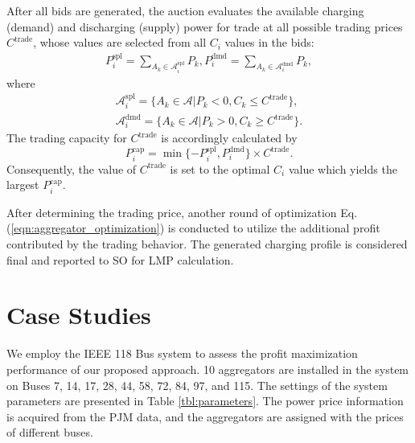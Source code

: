 \documentclass[conference]{IEEEtran}
\begin{document}
	After all bids are generated, the auction evaluates the available charging (demand) and discharging (supply) power for trade at all possible trading prices $C^\text{trade}$, whose values are selected from all $C_i$ values in the bids:
	\begin{align}\label{eqn:calculate_supplydemand}
	P^\text{spl}_i = \sum_{A_k\in\mathcal{A}^\text{spl}_i} P_k, 
	P^\text{dmd}_i = \sum_{A_k\in\mathcal{A}^\text{dmd}_i} P_k,
	\end{align}
	where
	\begin{align}
	\mathcal{A}^\text{spl}_i = \{A_k\in\mathcal{A}| P_k<0, C_k\leq C^\text{trade}\}, \label{eqn:selling}\\
	\mathcal{A}^\text{dmd}_i = \{A_k\in\mathcal{A}| P_k>0, C_k\geq C^\text{trade}\}. \label{eqn:buying}
	\end{align}
	The trading capacity for $C^\text{trade}$ is accordingly calculated by
	\begin{equation}
	P^\text{cap}_i = \min\{-P^\text{spl}_i,P^\text{dmd}_i\}\times C^\text{trade}.
	\end{equation}
Consequently, the value of $C^\text{trade}$ is set to the optimal $C_i$ value which yields the largest $P^\text{cap}_i$.
    
After determining the trading price, another round of optimization Eq. (\ref{eqn:aggregator_optimization}) is conducted to utilize the additional profit contributed by the trading behavior. The generated charging profile is considered final and reported to SO for LMP calculation.








	\vspace{-0.1cm}
	\section{Case Studies}
	\vspace{-0.1cm}
	




	We employ the IEEE 118 Bus system \cite{PowerSystemsTestCaseArchive-ref} to assess the profit maximization performance of our proposed approach. 10 aggregators are installed in the system on Buses 7, 14, 17, 28, 44, 58, 72, 84, 97, and 115. The settings of the system parameters are presented in Table \ref{tbl:parameters}. The power price information is acquired from the PJM \cite{PJMEnergyMarketInformation-ref} data, and the aggregators are assigned with the prices of different buses.
	
\end{document}
